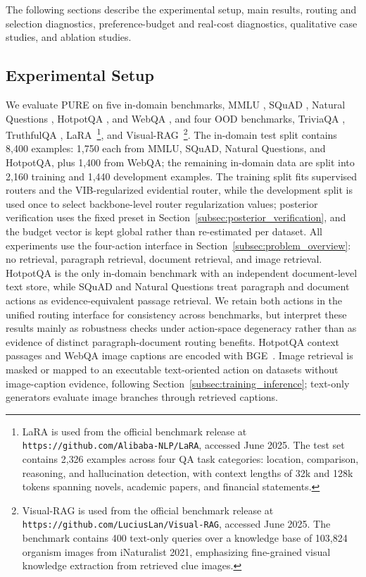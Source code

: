 \documentclass[a4paper,fleqn]{cas-dc}
\begin{document}
The following sections describe the experimental setup, main results, routing and selection diagnostics, preference-budget and real-cost diagnostics, qualitative case studies, and ablation studies.


\subsection{Experimental Setup}
\label{subsec:experimental_setup}

We evaluate PURE on five in-domain benchmarks, MMLU \citep{Hendrycks2021MMLU}, SQuAD \citep{Rajpurkar2016SQuAD}, Natural Questions \citep{Kwiatkowski2019NaturalQuestions}, HotpotQA \citep{Yang2018HotpotQA}, and WebQA \citep{Chang2022WebQA}, and four OOD benchmarks, TriviaQA \citep{Joshi2017TriviaQA}, TruthfulQA \citep{Lin2022TruthfulQA}, LaRA~\citep{Li2025LaRA}\footnote{LaRA is used from the official benchmark release at \texttt{https://github.com/Alibaba-NLP/LaRA}, accessed June 2025. The test set contains 2{,}326 examples across four QA task categories: location, comparison, reasoning, and hallucination detection, with context lengths of 32k and 128k tokens spanning novels, academic papers, and financial statements.}, and Visual-RAG~\citep{Wu2025VisualRAG}\footnote{Visual-RAG is used from the official benchmark release at \texttt{https://github.com/LuciusLan/Visual-RAG}, accessed June 2025. The benchmark contains 400 text-only queries over a knowledge base of 103{,}824 organism images from iNaturalist 2021, emphasizing fine-grained visual knowledge extraction from retrieved clue images.}. The in-domain test split contains 8,400 examples: 1,750 each from MMLU, SQuAD, Natural Questions, and HotpotQA, plus 1,400 from WebQA; the remaining in-domain data are split into 2,160 training and 1,440 development examples. The training split fits supervised routers and the VIB-regularized evidential router, while the development split is used once to select backbone-level router regularization values; posterior verification uses the fixed preset in Section~\ref{subsec:posterior_verification}, and the budget vector is kept global rather than re-estimated per dataset. All experiments use the four-action interface in Section~\ref{subsec:problem_overview}: no retrieval, paragraph retrieval, document retrieval, and image retrieval. HotpotQA is the only in-domain benchmark with an independent document-level text store, while SQuAD and Natural Questions treat paragraph and document actions as evidence-equivalent passage retrieval. We retain both actions in the unified routing interface for consistency across benchmarks, but interpret these results mainly as robustness checks under action-space degeneracy rather than as evidence of distinct paragraph-document routing benefits. HotpotQA context passages and WebQA image captions are encoded with BGE~\citep{Xiao2024CPack}. Image retrieval is masked or mapped to an executable text-oriented action on datasets without image-caption evidence, following Section~\ref{subsec:training_inference}; text-only generators evaluate image branches through retrieved captions.
\end{document}
